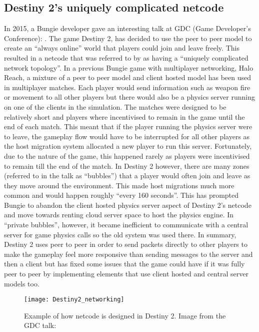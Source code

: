 \subsection{Destiny 2's uniquely complicated netcode}
In 2015, a Bungie developer gave an interesting talk at GDC (Game Developer's Conference): . The game Destiny 2, has decided to use the peer to peer model to create an ``always online'' world that players could join and leave freely. This resulted in a netcode that was referred to by \citeauthor{truman2015destiny2} as having a  ``uniquely complicated network topology''. In a previous Bungie game with multiplayer networking, Halo Reach,  a mixture of a peer to peer model and client hosted model has been used in multiplayer matches. Each player would send information such as weapon fire or movement to all other players but there would also be a physics server running on one of the clients in the simulation. The matches were designed to be relatively short and players where incentivised to remain in the game until the end of each match. This meant that if the player running the physics server were to leave, the gameplay flow would have to be interrupted for all other players as the host migration system allocated a new player to run this server. Fortunately, due to the nature of the game, this happened rarely as players were incentivised to remain till the end of the match. In Destiny 2 however, there are many zones (referred to in the talk as ``bubbles'') that a player would often join and leave as they move around the environment. This made host migrations much more common and would happen roughly ``every 160 seconds''. This has prompted Bungie to abandon the client hosted physics server aspect of Destiny 2's netcode and move towards renting cloud server space to host the physics engine. In ``private bubbles'', however, it became inefficient to communicate with a central server for game physics calls so the old system was used there. In summary, Destiny 2 uses peer to peer in order to send packets directly to other players to make the gameplay feel more responsive than sending messages to the server and then a client but has fixed some issues that the game could have if it was fully peer to peer by implementing elements that use client hosted and central server models too.

\begin{figure}[!h]
  \centering
  \texttt{[image: Destiny2\_networking]}
  \caption{Example of how netcode is designed in Destiny 2. Image from the GDC talk: }
  \label{fig:destiny2netcode}
\end{figure}

